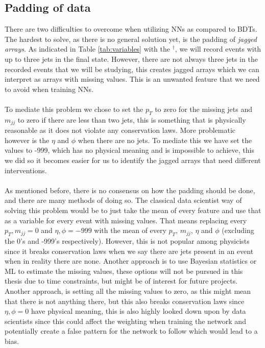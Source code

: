 \documentclass[12pt, a4paper]{book}
\begin{document}
\subsection{Padding of data}\label{sec:padding_NN}
There are two difficulties to overcome when utilizing NNs as compared to BDTs. The hardest to solve, as there is no general solution yet, is the padding of \textit{jagged arrays}. As indicated in Table \ref{tab:variables} with the $^\dagger$, we will record events 
with up to three jets in the final state. However, there are not always three jets in the recorded events that we will be studying, this creates jagged arrays which we can interpret as arrays with missing values. This is an unwanted feature that we need to avoid when 
training NNs.\\
\\To mediate this problem we chose to set the $p_T$ to zero for the missing jets and $m_{jj}$ to zero if there are less than two jets, this is something that is physically reasonable as it does not violate any conservation laws. 
More problematic however is the $\eta$ and $\phi$ when there are no jets. To mediate this we have set the values to -999, which has no physical meaning and is impossible to achieve, this we did so it becomes easier for us to identify the jagged arrays that 
need different interventions.\\
\\As mentioned before, there is no consensus on how the padding should be done, and there are many methods of doing so. The classical data scientist way of solving this problem would be to just take 
the mean of every feature and use that as a variable for every event with missing values. That means replacing every $p_T, m_{jj} = 0$ and $\eta,\phi=-999$ with the mean of every $p_T$, $m_{jj}$, $\eta$ and $\phi$ (excluding the 0's and -999's respectively). 
However, this is not popular among physicists since it breaks conservation laws when we say there are jets present in an event when in reality there are none. Another approach is to use Bayesian statistics or ML to estimate the missing values, 
these options will not be pursued in this thesis due to time constraints, but might be of interest for future projects. Another approach, is setting all the missing values to zero, as this might mean that there is not anything there, 
but this also breaks conservation laws since $\eta,\phi=0$ have physical meaning, this is also highly looked down upon by data scientists since this could affect the weighting when training the network and potentially create a false pattern for the network to follow which would lead to a bias.\\ 
\end{document}
